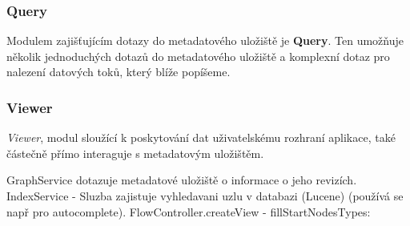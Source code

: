 \subsubsection{Query}


Modulem zajišťujícím dotazy do metadatového uložiště je \textbf{Query}. Ten umožňuje několik jednoduchých dotazů do metadatového uložiště a komplexní dotaz pro nalezení datových toků, který blíže popíšeme.  




\subsubsection{Viewer}
\textit{Viewer}, modul sloužící k poskytování dat uživatelskému rozhraní aplikace, také částečně přímo interaguje s metadatovým uložištěm. 

GraphService dotazuje metadatové uložiště o informace o jeho revizích. 
IndexService - Sluzba zajistuje vyhledavani uzlu v databazi (Lucene) (používá se např pro autocomplete).
FlowController.createView
 - fillStartNodesTypes: 




